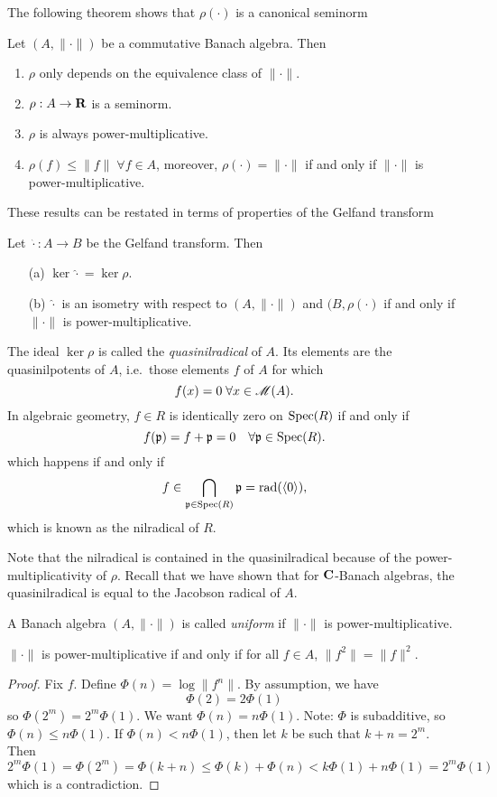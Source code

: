 The following theorem shows that $\rho(\cdot)$ is a canonical seminorm
\begin{theorem}\label{thm:rho}
Let $(A,\|\cdot\|)$ be a commutative Banach algebra. Then
\begin{enumerate}
\item $\rho$ only depends on the equivalence class of $\|\cdot \|$.
\item $\rho:A\to\mathbf{R}$ is a seminorm.
\item $\rho$ is always power-multiplicative.
\item $\rho(f)\leqslant\|f\|\;\forall f\in A$, moreover, $\rho(\cdot)=\|\cdot\|$ 
if and only if $\|\cdot\|$ is power-multiplicative.
\end{enumerate}
\end{theorem}
These results can be restated in terms of properties of the Gelfand transform
\begin{theorem}\label{thm:Gelfandtransform}
Let $\hat \cdot:A\to B$ be the Gelfand transform. Then
\begin{enumerate}
\item[(a)] $\ker \hat\cdot =\ker \rho$.
\item[(b)] $\hat\cdot$ is an isometry with respect to $(A,\|\cdot\|)$ and 
$(B,\rho(\cdot)$ if and only if $\|\cdot\|$ is power-multiplicative.
\end{enumerate}
\end{theorem}
The ideal $\ker\rho$ is called the \emph{quasinilradical} of $A$. Its elements 
are the quasinilpotents of $A$, i.e.~those elements $f$ of $A$ for which
\[
  f(x)=0 \;\forall x\in \operatorname{\mathscr{M}}(A).
\]
In algebraic geometry, $f\in R$ is identically zero on $\operatorname{Spec}(R)$ if and only 
if
\[
  f(\mathfrak{p})=f+\mathfrak{p}=0\quad \forall\mathfrak{p}\in\operatorname{Spec}(R).
\]
which happens if and only if
\[
  f\in\bigcap_{\mathfrak{p}\in\operatorname{Spec}(R)}\mathfrak{p}=\text{rad}(\langle 0\rangle),
\]
which is known as the nilradical of $R$.

Note that the nilradical is contained in the quasinilradical because of the 
power-multiplicativity of $\rho$. Recall that we have shown that for 
$\mathbf{C}$-Banach algebras, the quasinilradical is equal to the Jacobson radical of 
$A$.

\begin{definition}\label{def:uniform}
A Banach algebra $(A,\|\cdot\|)$ is called \emph{uniform} if $\|\cdot\|$ is 
power-multiplicative.
\end{definition}
\begin{lemma}\label{lem:squaresonly}
$\|\cdot \|$ is power-multiplicative if and only if for all $f\in A$, 
$\| f^2\|=\|f\|^2$.
\end{lemma}
\begin{proof}
Fix $f$. Define $\Phi(n)=\log \|f^n\|$. By assumption, we have
\[
  \Phi(2)=2\Phi(1)
\]
so $\Phi(2^m)=2^m\Phi(1)$. We want $\Phi(n)=n\Phi(1)$. Note: $\Phi$ is 
subadditive, so $\Phi(n)\leqslant n\Phi(1)$. If $\Phi(n)<n\Phi(1)$, then let 
$k$ be such that $k+n=2^m$. Then
\[
  2^m\Phi(1)=\Phi(2^m)=\Phi(k+n)\leqslant \Phi(k)+\Phi(n)<k\Phi(1)+n\Phi(1)=2^m\Phi(1)
\]
which is a contradiction.
\end{proof}

